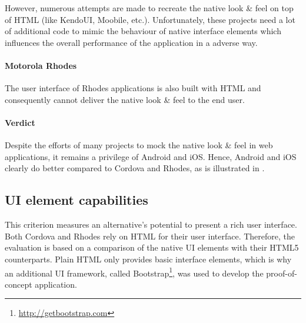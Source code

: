 However, numerous attempts are made to recreate the native look \& feel on top of HTML (like KendoUI, Moobile, etc.). Unfortunately, these projects need a lot of additional code to mimic the behaviour of native interface elements which influences the overall performance of the application in a adverse way.

\paragraph{Motorola Rhodes} The user interface of Rhodes applications is also built with HTML and consequently cannot deliver the native look \& feel to the end user.

\paragraph{Verdict} Despite the efforts of many projects to mock the native look \& feel in web applications, it remains a privilege of Android and iOS. Hence, Android and iOS clearly do better compared to Cordova and Rhodes, as is illustrated in .


\subsection{UI element capabilities}

This criterion measures an alternative's potential to present a rich user interface. Both Cordova and Rhodes rely on HTML for their user interface. Therefore, the evaluation is based on a comparison of the native UI elements with their HTML5 counterparts. Plain HTML only provides basic interface elements, which is why an additional UI framework, called Bootstrap\footnote{\url{http://getbootstrap.com}}, was used to develop the proof-of-concept application. 

